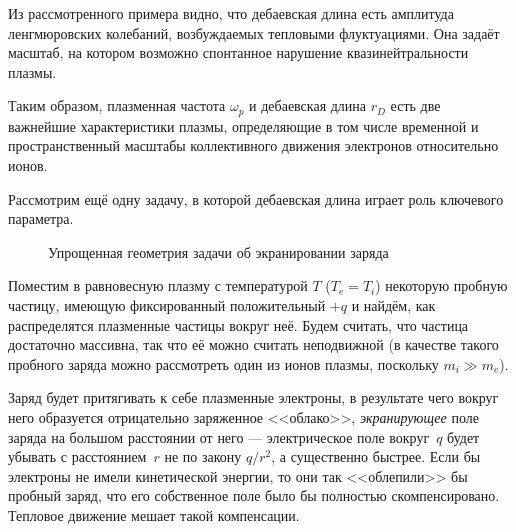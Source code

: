 Из рассмотренного примера видно, что дебаевская длина есть амплитуда ленгмюровских колебаний,
возбуждаемых тепловыми флуктуациями. Она задаёт масштаб, на котором возможно
спонтанное нарушение квазинейтральности плазмы.

Таким образом, плазменная частота $\omega_p$ и дебаевская длина $r_D$
есть две важнейшие характеристики плазмы, определяющие в том числе
временной и пространственный масштабы коллективного движения электронов
относительно ионов.



Рассмотрим ещё одну задачу, в которой дебаевская длина играет роль
ключевого параметра.

\begin{wrapfigure}{o}{0.3\textwidth}
    \centering
    \caption{Упрощенная геометрия задачи об экранировании заряда}
\end{wrapfigure}

Поместим в равновесную плазму с температурой $T$ ($T_e=T_i$) некоторую пробную частицу, 
имеющую фиксированный
положительный $+q$ и найдём, как распределятся плазменные частицы вокруг неё.
Будем считать, что частица достаточно массивна, так что её можно
считать неподвижной (в качестве такого пробного заряда можно рассмотреть
один из ионов плазмы, поскольку $m_i \gg m_e$).

Заряд будет притягивать к себе плазменные электроны, в результате чего
вокруг него образуется отрицательно заряженное <<облако>>,
\emph{экранирующее} поле заряда на большом расстоянии от него ---
электрическое поле вокруг~$q$ будет убывать с расстоянием~$r$
не по закону $q/r^2$, а существенно быстрее.
Если бы электроны не имели кинетической энергии, то они так <<облепили>>
бы пробный заряд, что его собственное поле было бы полностью скомпенсировано.
Тепловое движение мешает такой компенсации.

